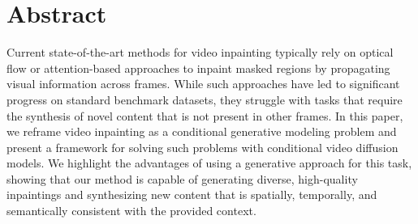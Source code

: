 \chapter{Abstract}
Current state-of-the-art methods for video inpainting typically rely on optical flow or attention-based approaches to inpaint masked regions by propagating visual information across frames. While such approaches have led to significant progress on standard benchmark datasets, they struggle with tasks that require the synthesis of novel content that is not present in other frames. In this paper, we reframe video inpainting as a conditional generative modeling problem and present a framework for solving such problems with conditional video diffusion models. We highlight the advantages of using a generative approach for this task, showing that our method is capable of generating diverse, high-quality inpaintings and synthesizing new content that is spatially, temporally, and semantically consistent with the provided context.